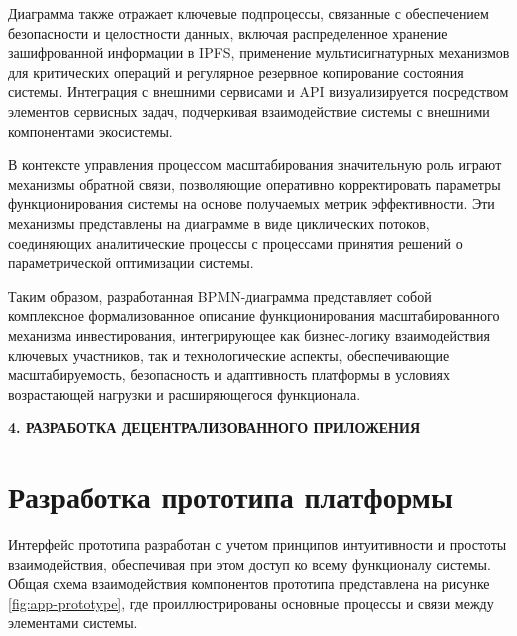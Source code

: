 \documentclass[
    candidate, %
    subf, %
    dotsinheaders=false,
]{disser}
\begin{document}
Диаграмма также отражает ключевые подпроцессы, связанные с обеспечением безопасности и целостности данных, включая распределенное хранение зашифрованной информации в IPFS, применение мультисигнатурных механизмов для критических операций и регулярное резервное копирование состояния системы. Интеграция с внешними сервисами и API визуализируется посредством элементов сервисных задач, подчеркивая взаимодействие системы с внешними компонентами экосистемы.

В контексте управления процессом масштабирования значительную роль играют механизмы обратной связи, позволяющие оперативно корректировать параметры функционирования системы на основе получаемых метрик эффективности. Эти механизмы представлены на диаграмме в виде циклических потоков, соединяющих аналитические процессы с процессами принятия решений о параметрической оптимизации системы.

Таким образом, разработанная BPMN-диаграмма представляет собой комплексное формализованное описание функционирования масштабированного механизма инвестирования, интегрирующее как бизнес-логику взаимодействия ключевых участников, так и технологические аспекты, обеспечивающие масштабируемость, безопасность и адаптивность платформы в условиях возрастающей нагрузки и расширяющегося функционала.

\newpage
\begin{center}
  \textbf{4. РАЗРАБОТКА ДЕЦЕНТРАЛИЗОВАННОГО ПРИЛОЖЕНИЯ}
\end{center}


\section{Разработка прототипа платформы}

Интерфейс прототипа разработан с учетом принципов интуитивности и простоты взаимодействия, обеспечивая при этом доступ ко всему функционалу системы.
Общая схема взаимодействия компонентов прототипа представлена на рисунке \ref{fig:app-prototype}, где проиллюстрированы основные процессы и связи между элементами системы.
\end{document}
